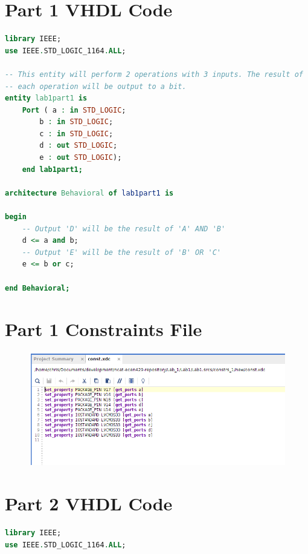 \documentclass[11pt]{article}
\begin{document}
\begin{appendices}

\section{Part 1 VHDL Code}

\begin{lstlisting}[language=VHDL]
library IEEE;
use IEEE.STD_LOGIC_1164.ALL;

-- This entity will perform 2 operations with 3 inputs. The result of 
-- each operation will be output to a bit.
entity lab1part1 is
    Port ( a : in STD_LOGIC;
        b : in STD_LOGIC;
        c : in STD_LOGIC;
        d : out STD_LOGIC;
        e : out STD_LOGIC);
	end lab1part1;

architecture Behavioral of lab1part1 is

begin
   	-- Output 'D' will be the result of 'A' AND 'B'
   	d <= a and b;
   	-- Output 'E' will be the result of 'B' OR 'C'
   	e <= b or c;

end Behavioral;
\end{lstlisting}

\section{Part 1 Constraints File}

\begin{figure}[h]
	\includegraphics[width=\textwidth]{report_images/img5}
\end{figure}

\section{Part 2 VHDL Code}

\begin{lstlisting}[language=VHDL]
library IEEE;
use IEEE.STD_LOGIC_1164.ALL;


\end{lstlisting}
\end{appendices}
\end{document}
